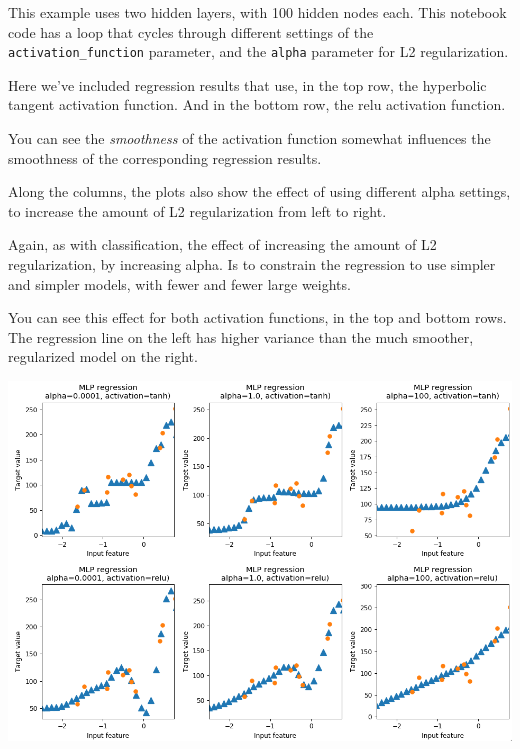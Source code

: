 \begin{multicols}{2}
This example uses two hidden layers, with 100 hidden nodes each. This notebook code has a loop that cycles through different settings of the \texttt{activation_function} parameter, and the \texttt{alpha} parameter for L2 regularization. 

Here we've included regression results that use, in the top row, the hyperbolic tangent activation function. And in the bottom row, the relu activation function. 


You can see the \emph{smoothness} of the activation function somewhat influences the smoothness of the corresponding regression results. 

Along the columns, the plots also show the effect of using different alpha settings, to increase the amount of L2 regularization from left to right. 

Again, as with classification, the effect of increasing the amount of L2 regularization, by increasing alpha. Is to constrain the regression to use simpler and simpler models, with fewer and fewer large weights. 

You can see this effect for both activation functions, in the top and bottom rows. The regression line on the left has higher variance than the much smoother, regularized model on the right. 

\end{multicols}
\begin{center}
	\includegraphics[width=\linewidth]{img/Neural-Networks-Regression.png} 
\end{center}

